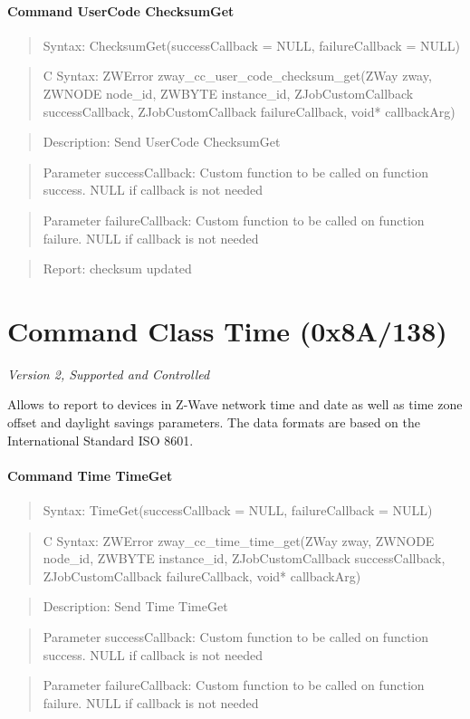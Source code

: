 \paragraph{Command UserCode ChecksumGet}
\begin{quote}Syntax: ChecksumGet(successCallback = NULL, failureCallback = NULL)\end{quote}
\begin{quote}C Syntax: ZWError zway\_cc\_user\_code\_checksum\_get(ZWay zway, ZWNODE node\_id, ZWBYTE instance\_id, ZJobCustomCallback successCallback, ZJobCustomCallback failureCallback, void* callbackArg)\end{quote}
\begin{quote}Description: Send UserCode ChecksumGet\end{quote}
\begin{quote}Parameter successCallback: Custom function to be called on function success. NULL if callback is not needed\end{quote}
\begin{quote}Parameter failureCallback: Custom function to be called on function failure. NULL if callback is not needed\end{quote}
\begin{quote}Report: checksum updated\end{quote}


\section{Command Class Time (0x8A/138)}

\textit{Version 2, Supported and Controlled}
\newline

Allows to report to devices in Z-Wave network time and date as well as time zone offset and daylight savings parameters. The data formats are based on the International Standard ISO 8601.
\paragraph{Command Time TimeGet}
\begin{quote}Syntax: TimeGet(successCallback = NULL, failureCallback = NULL)\end{quote}
\begin{quote}C Syntax: ZWError zway\_cc\_time\_time\_get(ZWay zway, ZWNODE node\_id, ZWBYTE instance\_id, ZJobCustomCallback successCallback, ZJobCustomCallback failureCallback, void* callbackArg)\end{quote}
\begin{quote}Description: Send Time TimeGet\end{quote}
\begin{quote}Parameter successCallback: Custom function to be called on function success. NULL if callback is not needed\end{quote}
\begin{quote}Parameter failureCallback: Custom function to be called on function failure. NULL if callback is not needed\end{quote}


